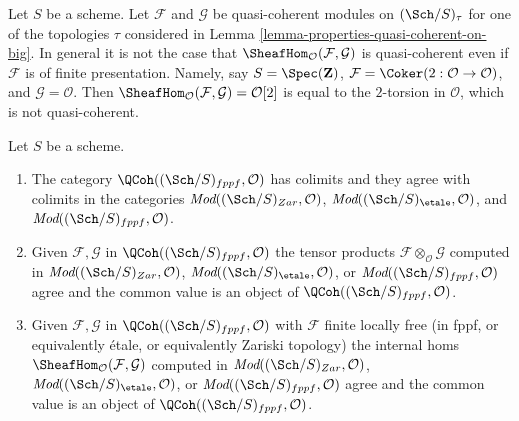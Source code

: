 \begin{example}
\label{example-internal-hom-not-qcoh}
Let $S$ be a scheme. Let $\mathcal{F}$ and $\mathcal{G}$ be quasi-coherent
modules on $(\Sch/S)_\tau$ for one of the topologies $\tau$ considered in
Lemma \ref{lemma-properties-quasi-coherent-on-big}.
In general it is not the case that
$\SheafHom_\mathcal{O}(\mathcal{F}, \mathcal{G})$
is quasi-coherent even if $\mathcal{F}$ is of finite presentation.
Namely, say $S = \Spec(\mathbf{Z})$,
$\mathcal{F} = \Coker(2 : \mathcal{O} \to \mathcal{O})$,
and $\mathcal{G} = \mathcal{O}$. Then
$\SheafHom_\mathcal{O}(\mathcal{F}, \mathcal{G}) = \mathcal{O}[2]$
is equal to the $2$-torsion in $\mathcal{O}$, which is not quasi-coherent.
\end{example}

\begin{lemma}
\label{lemma-qc-colimits}
Let $S$ be a scheme.
\begin{enumerate}
\item The category $\QCoh((\Sch/S)_{fppf}, \mathcal{O})$
has colimits and they agree with colimits in the categories
$\textit{Mod}((\Sch/S)_{Zar}, \mathcal{O})$,
$\textit{Mod}((\Sch/S)_\etale, \mathcal{O})$, and
$\textit{Mod}((\Sch/S)_{fppf}, \mathcal{O})$.
\item Given $\mathcal{F}, \mathcal{G}$ in $\QCoh((\Sch/S)_{fppf}, \mathcal{O})$
the tensor products $\mathcal{F} \otimes_\mathcal{O} \mathcal{G}$
computed in $\textit{Mod}((\Sch/S)_{Zar}, \mathcal{O})$,
$\textit{Mod}((\Sch/S)_\etale, \mathcal{O})$, or
$\textit{Mod}((\Sch/S)_{fppf}, \mathcal{O})$ agree and the common value
is an object of $\QCoh((\Sch/S)_{fppf}, \mathcal{O})$.
\item Given $\mathcal{F}, \mathcal{G}$ in $\QCoh((\Sch/S)_{fppf}, \mathcal{O})$
with $\mathcal{F}$ finite locally free (in fppf, or equivalently \'etale, or
equivalently Zariski topology) the internal homs
$\SheafHom_\mathcal{O}(\mathcal{F}, \mathcal{G})$
computed in $\textit{Mod}((\Sch/S)_{Zar}, \mathcal{O})$,
$\textit{Mod}((\Sch/S)_\etale, \mathcal{O})$, or
$\textit{Mod}((\Sch/S)_{fppf}, \mathcal{O})$ agree and the common value
is an object of $\QCoh((\Sch/S)_{fppf}, \mathcal{O})$.
\end{enumerate}
\end{lemma}

